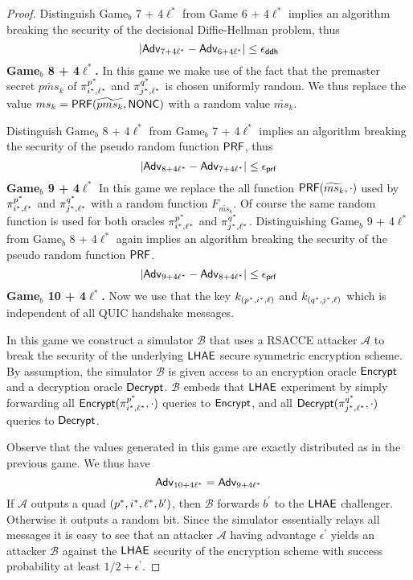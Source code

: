 \begin{proof}
 Distinguish Game$_b$ 7 + 4$\ell^{\ast}$ from Game 6 + 4$\ell^{\ast}$ implies an algorithm breaking the security of the decisional Diffie-Hellman problem, thus
 \begin{equation}
  |\mathsf{Adv}_{7 + 4\ell^{\ast}} - \mathsf{Adv}_{6 + 4\ell^{\ast}}| \leq \epsilon_{\mathsf{ddh}}
 \end{equation}%
%
%
 \textbf{Game$_b$ 8 + 4$\ell^{\ast}$.} In this game we make use of the fact that the premaster secret $\widetilde{pms_{k}}$ of $\pi^{p^{\ast}}_{i^{\ast},\ell^{\ast}}$ and $\pi^{q^{\ast}}_{j^{\ast},\ell^{\ast}}$ is chosen uniformly random. We thus replace the value $ms_{k} = \mathsf{PRF}(\widetilde{pms_{k}}, \mathsf{NONC})$ with a random value $\widetilde{ms_{k}}$.

 Distinguish Game$_b$ 8 + 4$\ell^{\ast}$ from Game$_b$ 7 + 4$\ell^{\ast}$ implies an algorithm breaking the security of the pseudo random function $\mathsf{PRF}$, thus
 \begin{equation}
  |\mathsf{Adv}_{8 + 4\ell^{\ast}} - \mathsf{Adv}_{7 + 4\ell^{\ast}}| \leq \epsilon_{\mathsf{prf}}
 \end{equation}%
%
%
 \textbf{Game$_b$ 9 + 4$\ell^{\ast}$} In this game we replace the all function $\mathsf{PRF}(\widetilde{ms_{k}}, \cdot)$ used by $\pi^{p^{\ast}}_{i^{\ast},\ell^{\ast}}$ and $\pi^{q^{\ast}}_{j^{\ast},\ell^{\ast}}$ with a random function $F_{\widetilde{ms_{k}}}$. Of course the same random function is used for both oracles $\pi^{p^{\ast}}_{i^{\ast},\ell^{\ast}}$ and $\pi^{q^{\ast}}_{j^{\ast},\ell^{\ast}}$. Distinguishing Game$_b$ 9 + 4$\ell^{\ast}$ from Game$_b$ 8 + 4$\ell^{\ast}$ again implies an algorithm breaking the security of the pseudo random function $\mathsf{PRF}$.
 \begin{equation}
  |\mathsf{Adv}_{9 + 4\ell^{\ast}} - \mathsf{Adv}_{8 + 4\ell^{\ast}}| \leq \epsilon_{\mathsf{prf}}
 \end{equation}%
%
%
 \textbf{Game$_b$ 10 + 4$\ell^{\ast}$.} Now we use that the key $k_{(p^{\ast}, i^{\ast}, \ell)}$ and $k_{(q^{\ast}, j^{\ast}, \ell)}$ which is independent of all QUIC handshake messages.

 In this game we construct a simulator $\mathcal{B}$ that uses a RSACCE attacker $\mathcal{A}$ to break the security of the underlying $\mathsf{LHAE}$ secure symmetric encryption scheme. By assumption, the simulator $\mathcal{B}$ is given access to an encryption oracle $\mathsf{Encrypt}$ and a decryption oracle $\mathsf{Decrypt}$. $\mathcal{B}$ embeds that $\mathsf{LHAE}$ experiment by simply forwarding all $\mathsf{Encrypt}(\pi^{p^{\ast}}_{i^{\ast},\ell^{\ast}},\cdot)$ queries to $\mathsf{Encrypt}$, and all $\mathsf{Decrypt}(\pi^{q^{\ast}}_{j^{\ast},\ell^{\ast}},\cdot)$ queries to $\mathsf{Decrypt}$.

 Observe that the values generated in this game are exactly distributed as in the previous game. We thus have
 \begin{equation}
  \mathsf{Adv}_{10 + 4\ell^{\ast}} = \mathsf{Adv}_{9 + 4\ell^{\ast}}
 \end{equation}%
 If $\mathcal{A}$ outputs a quad $(p^{\ast}, i^{\ast}, \ell^{\ast}, b^{\prime})$, then $\mathcal{B}$ forwards $b^{\prime}$ to the $\mathsf{LHAE}$ challenger. Otherwise it outputs a random bit. Since the simulator essentially relays all messages it is easy to see that an attacker $\mathcal{A}$ having advantage $\epsilon^{\prime}$ yields an attacker $\mathcal{B}$ against the $\mathsf{LHAE}$ security of the encryption scheme with success probability at least $1/2 + \epsilon^{\prime}$.


\end{proof}
